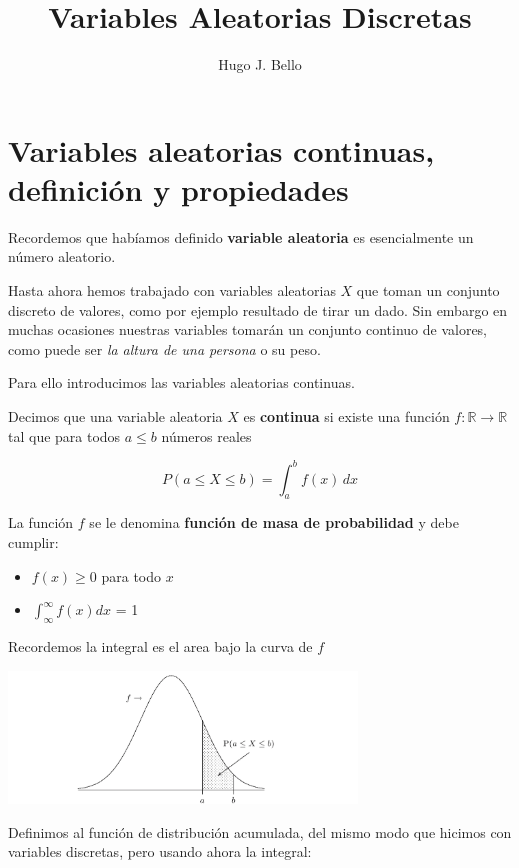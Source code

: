 \documentclass[
]{article}
\title{Variables Aleatorias Discretas}
\author{Hugo J. Bello}
\date{}
\providecommand{\tightlist}{%
  \setlength{\itemsep}{0pt}\setlength{\parskip}{0pt}}
\begin{document}
\maketitle

\hypertarget{variables-aleatorias-continuas-definiciuxf3n-y-propiedades}{%
\section{Variables aleatorias continuas, definición y
propiedades}\label{variables-aleatorias-continuas-definiciuxf3n-y-propiedades}}

Recordemos que habíamos definido \textbf{variable aleatoria} es
esencialmente un número aleatorio.

Hasta ahora hemos trabajado con variables aleatorias \(X\) que toman un
conjunto discreto de valores, como por ejemplo resultado de tirar un
dado. Sin embargo en muchas ocasiones nuestras variables tomarán un
conjunto continuo de valores, como puede ser \emph{la altura de una
persona} o su peso.

Para ello introducimos las variables aleatorias continuas.

Decimos que una variable aleatoria \(X\) es \textbf{continua} si existe
una función \(f:\mathbb R \to \mathbb R\) tal que para todos \(a\leq b\)
números reales

\[\displaystyle P(a\leq X\leq b)=\int _{a}^{b}f(x)\,dx\]

La función \(f\) se le denomina \textbf{función de masa de probabilidad}
y debe cumplir:

\begin{itemize}
\tightlist
\item
  \(f(x)\geq 0\) para todo \(x\)
\item
  \(\int^\infty_\infty f(x)dx\) = 1
\end{itemize}

Recordemos la integral es el area bajo la curva de \(f\)

\includegraphics[width=3.64583in,height=\textheight]{sc_1.png}

Definimos al función de distribución acumulada, del mismo modo que
hicimos con variables discretas, pero usando ahora la integral:
\end{document}

